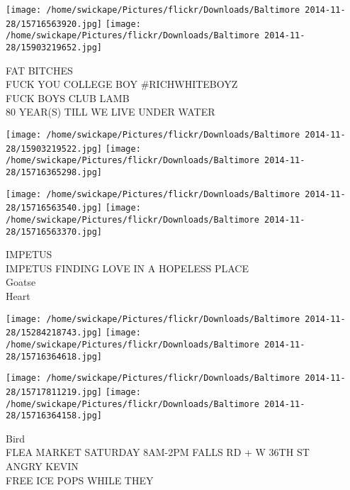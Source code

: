 \documentclass[10pt,letterpaper]{article}
\begin{document}
\texttt{[image: /home/swickape/Pictures/flickr/Downloads/Baltimore 2014-11-28/15716563920.jpg]}
\texttt{[image: /home/swickape/Pictures/flickr/Downloads/Baltimore 2014-11-28/15903219652.jpg]}

FAT BITCHES\\
FUCK YOU COLLEGE BOY \#RICHWHITEBOYZ\\
FUCK BOYS CLUB LAMB\\
80 YEAR(S) TILL WE LIVE UNDER WATER
\pagebreak

\texttt{[image: /home/swickape/Pictures/flickr/Downloads/Baltimore 2014-11-28/15903219522.jpg]}
\texttt{[image: /home/swickape/Pictures/flickr/Downloads/Baltimore 2014-11-28/15716365298.jpg]}

\texttt{[image: /home/swickape/Pictures/flickr/Downloads/Baltimore 2014-11-28/15716563540.jpg]}
\texttt{[image: /home/swickape/Pictures/flickr/Downloads/Baltimore 2014-11-28/15716563370.jpg]}

IMPETUS\\
IMPETUS FINDING LOVE IN A HOPELESS PLACE\\
Goatse\\
Heart
\pagebreak

\texttt{[image: /home/swickape/Pictures/flickr/Downloads/Baltimore 2014-11-28/15284218743.jpg]}
\texttt{[image: /home/swickape/Pictures/flickr/Downloads/Baltimore 2014-11-28/15716364618.jpg]}

\texttt{[image: /home/swickape/Pictures/flickr/Downloads/Baltimore 2014-11-28/15717811219.jpg]}
\texttt{[image: /home/swickape/Pictures/flickr/Downloads/Baltimore 2014-11-28/15716364158.jpg]}

Bird\\
FLEA MARKET SATURDAY 8AM{-}2PM FALLS RD + W 36TH ST\\
ANGRY KEVIN\\
FREE ICE POPS WHILE THEY
\pagebreak
\end{document}
